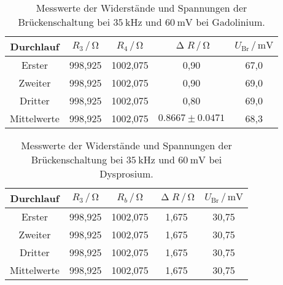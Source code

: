 \begin{table}[H]
  \centering
  \caption{Messwerte der Widerstände und Spannungen der Brückenschaltung bei $\SI{35}{\kilo\hertz}$ und $\SI{60}{\milli\volt}$ bei Gadolinium.}
  \label{tab:GdMessw}
  \begin{tabular}{c| c c c c}
    \toprule
    Durchlauf & $R_3 \,/\, \si{\ohm}$ & $R_4 \,/\, \si{\ohm}$ & $\upDelta R \,/\, \si{\ohm}$ & $U_{\text{Br}} \,/\, \si{\milli\volt}$ \\
    \midrule
    Erster & 998,925 & 1002,075 & 0,90 & 67,0 \\
    Zweiter & 998,925 & 1002,075 & 0,90 & 69,0 \\
    Dritter & 998,925 & 1002,075 & 0,80 & 69,0 \\
    Mittelwerte & 998,925 & 1002,075 & $0.8667 \pm 0.0471$ & 68,3\\
    \bottomrule
  \end{tabular}
\end{table}

\begin{table}[H]
  \centering
  \caption{Messwerte der Widerstände und Spannungen der Brückenschaltung bei $\SI{35}{\kilo\hertz}$ und $\SI{60}{\milli\volt}$ bei Dysprosium.}
  \label{tab:DyMessw}
  \begin{tabular}{c| c c c c}
    \toprule
    Durchlauf & $R_3 \,/\, \si{\ohm}$ & $R_b \,/\, \si{\ohm}$ & $\upDelta R \,/\, \si{\ohm}$ & $U_{\text{Br}} \,/\, \si{\milli\volt}$ \\
    \midrule
    Erster & 998,925 & 1002,075 & 1,675 & 30,75 \\
    Zweiter & 998,925 & 1002,075 & 1,675 & 30,75 \\
    Dritter & 998,925 & 1002,075 & 1,675 & 30,75 \\
    Mittelwerte & 998,925 & 1002,075 & 1,675 & 30,75 \\
    \bottomrule
  \end{tabular}
\end{table}

